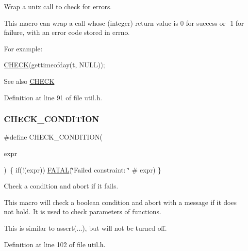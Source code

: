 Wrap a unix call to check for errors. 

This macro can wrap a call whose (integer) return value is 0 for success or -\/1 for failure, with an error code stored in errno.

For example\+: 
\begin{DoxyCode}
\hyperlink{group__check__macros_ga1992445028206dcca9c93c9a0b558436}{CHECK}(gettimeofday(t, NULL));
\end{DoxyCode}
 \begin{DoxySeeAlso}{See also}
\hyperlink{group__check__macros_ga1992445028206dcca9c93c9a0b558436}{C\+H\+E\+CK} 
\end{DoxySeeAlso}


Definition at line 91 of file util.\+h.

\mbox{\label{group__check__macros_ga6196238e8ab53ab90e7bf7ab51fc73e9}} 
\subsubsection{\texorpdfstring{C\+H\+E\+C\+K\+\_\+\+C\+O\+N\+D\+I\+T\+I\+ON}{CHECK\_CONDITION}}
{\footnotesize\ttfamily \#define C\+H\+E\+C\+K\+\_\+\+C\+O\+N\+D\+I\+T\+I\+ON(\begin{DoxyParamCaption}\item[{}]{expr }\end{DoxyParamCaption})~\{ if(!(expr)) \hyperlink{group__check__macros_ga7a3e1d362790a375466c5e77a6d5c9c5}{F\+A\+T\+AL}(\char`\"{}Failed constraint\+: \char`\"{} \# expr) \}}



Check a condition and abort if it fails. 

This macro will check a boolean condition and abort with a message if it does not hold. It is used to check parameters of functions.

This is similar to {\ttfamily assert}(...), but will not be turned off. 

Definition at line 102 of file util.\+h.

\mbox{\label{group__check__macros_ga879857ca00d32faa0d6cfe416428a804}} 
